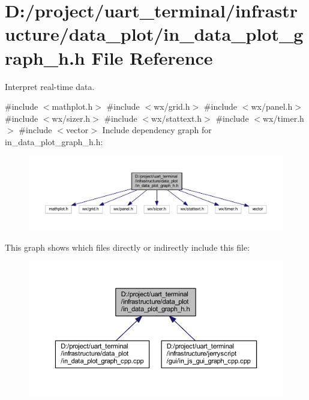\section{D\+:/project/uart\+\_\+terminal/infrastructure/data\+\_\+plot/in\+\_\+data\+\_\+plot\+\_\+graph\+\_\+h.h File Reference}
\label{in__data__plot__graph__h_8h}


Interpret real-\/time data.  


{\ttfamily \#include $<$mathplot.\+h$>$}\newline
{\ttfamily \#include $<$wx/grid.\+h$>$}\newline
{\ttfamily \#include $<$wx/panel.\+h$>$}\newline
{\ttfamily \#include $<$wx/sizer.\+h$>$}\newline
{\ttfamily \#include $<$wx/stattext.\+h$>$}\newline
{\ttfamily \#include $<$wx/timer.\+h$>$}\newline
{\ttfamily \#include $<$vector$>$}\newline
Include dependency graph for in\+\_\+data\+\_\+plot\+\_\+graph\+\_\+h.\+h\+:
\nopagebreak
\begin{figure}[H]
\begin{center}
\leavevmode
\includegraphics[width=350pt]{in__data__plot__graph__h_8h__incl}
\end{center}
\end{figure}
This graph shows which files directly or indirectly include this file\+:
\nopagebreak
\begin{figure}[H]
\begin{center}
\leavevmode
\includegraphics[width=350pt]{in__data__plot__graph__h_8h__dep__incl}
\end{center}
\end{figure}
